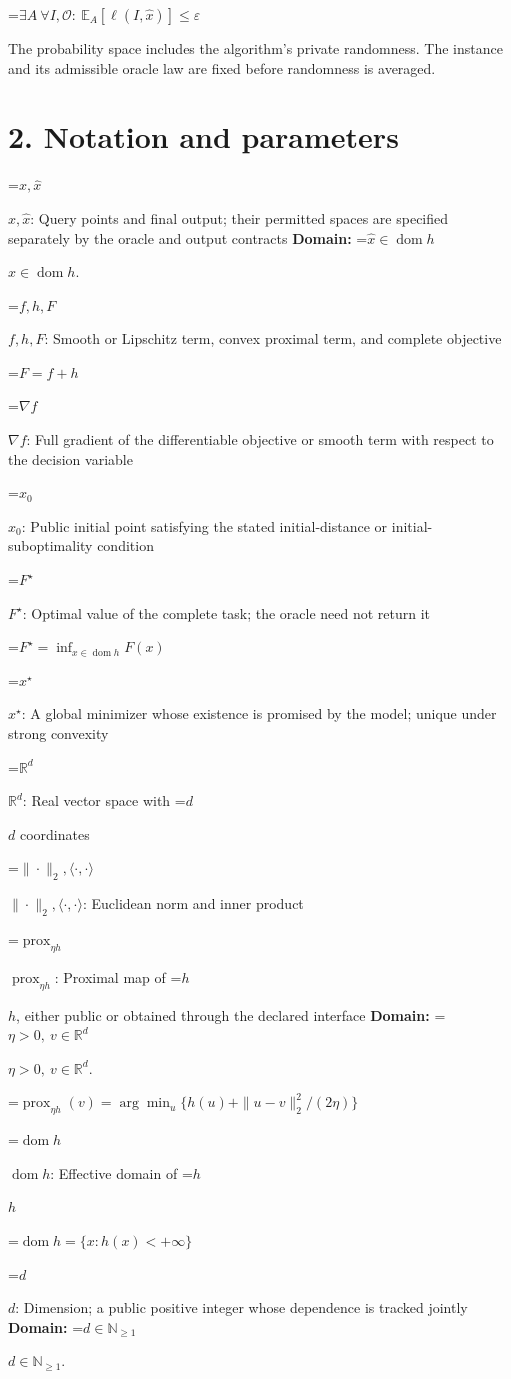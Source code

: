 \documentclass[10pt,a4paper]{article}
\newcommand{\AtlasMath}[1]{\par\begingroup\centering\setbox0=\hbox{$\displaystyle #1$}\ifdim\wd0>1.4\linewidth\typeout{ATLAS WIDE FORMULA: \the\wd0}\fi\ifdim\wd0>\linewidth\resizebox{\linewidth}{!}{\box0}\else\box0\fi\par\endgroup}
\newcommand{\AtlasInlineMath}[1]{\begingroup\setbox0=\hbox{$#1$}\ifdim\wd0>.4\linewidth\endgroup\AtlasMath{#1}\else\endgroup$#1$\fi}
\begin{document}
\AtlasMath{\exists A\ \forall I,\mathcal{O}:\ \mathbb{E}_A[\ell(I,\widehat{x})]\le\varepsilon}


The probability space includes the algorithm's private randomness. The instance and its admissible oracle law are fixed before randomness is averaged.

\section{2. Notation and parameters}
\AtlasInlineMath{x,\widehat{x}}: Query points and final output; their permitted spaces are specified separately by the oracle and output contracts \textbf{Domain:} \AtlasInlineMath{\widehat{x}\in \operatorname{dom}h}.

\AtlasInlineMath{f,h,F}: Smooth or Lipschitz term, convex proximal term, and complete objective


\AtlasMath{F=f+h}


\AtlasInlineMath{\nabla f}: Full gradient of the differentiable objective or smooth term with respect to the decision variable

\AtlasInlineMath{x_0}: Public initial point satisfying the stated initial-distance or initial-suboptimality condition

\AtlasInlineMath{F^\star}: Optimal value of the complete task; the oracle need not return it


\AtlasMath{F^\star=\inf_{x\in \operatorname{dom}h}F(x)}


\AtlasInlineMath{x^\star}: A global minimizer whose existence is promised by the model; unique under strong convexity

\AtlasInlineMath{\mathbb{R}^d}: Real vector space with \AtlasInlineMath{d} coordinates

\AtlasInlineMath{\|\cdot\|_2,\langle\cdot,\cdot\rangle}: Euclidean norm and inner product

\AtlasInlineMath{\operatorname{prox}_{\eta h}}: Proximal map of \AtlasInlineMath{h}, either public or obtained through the declared interface \textbf{Domain:} \AtlasInlineMath{\eta>0,\ v\in\mathbb{R}^d}.


\AtlasMath{\operatorname{prox}_{\eta h}(v)=\arg\min_u\{h(u)+\|u-v\|_2^2/(2\eta)\}}


\AtlasInlineMath{\operatorname{dom}h}: Effective domain of \AtlasInlineMath{h}


\AtlasMath{\operatorname{dom}h=\{x:h(x)<+\infty\}}


\AtlasInlineMath{d}: Dimension; a public positive integer whose dependence is tracked jointly \textbf{Domain:} \AtlasInlineMath{d\in\mathbb{N}_{\ge1}}.
\end{document}
